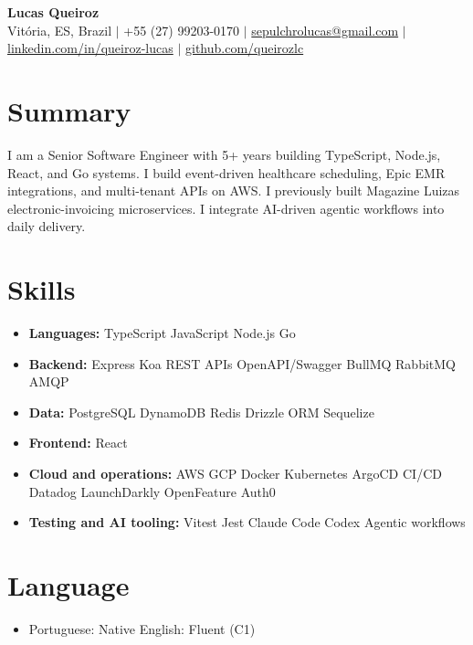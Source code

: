 \documentclass[letterpaper,10pt]{article}
\newcommand{\resumeItem}[1]{\item\small{#1}}
\newcommand{\resumeSubHeadingList}{\begin{itemize}[leftmargin=0.15in, label={}, nosep, beginpenalty=10000]}
\newcommand{\resumeSubHeadingListEnd}{\end{itemize}}
\begin{document}
\begin{center}
  \textbf{\Huge Lucas Queiroz} \\[3pt]
  \small Vit\'oria, ES, Brazil $|$ +55 (27) 99203-0170 $|$ \href{mailto:sepulchrolucas@gmail.com}{sepulchrolucas@gmail.com} $|$
  \href{https://linkedin.com/in/queiroz-lucas}{linkedin.com/in/queiroz-lucas} $|$
  \href{https://github.com/queirozlc}{github.com/queirozlc}
\end{center}
\vspace{2pt}

\section{Summary}
I am a Senior Software Engineer with 5+ years building TypeScript, Node.js, React, and Go systems. I build event-driven healthcare scheduling, Epic EMR integrations, and multi-tenant APIs on AWS. I previously built Magazine Luiza\textquotesingle{}s electronic-invoicing microservices. I integrate AI-driven agentic workflows into daily delivery.

\section{Skills}
\resumeSubHeadingList
\resumeItem{\textbf{Languages:} TypeScript \textbar{} JavaScript \textbar{} Node.js \textbar{} Go}
\resumeItem{\textbf{Backend:} Express \textbar{} Koa \textbar{} REST APIs \textbar{} OpenAPI/Swagger \textbar{} BullMQ \textbar{} RabbitMQ \textbar{} AMQP}
\resumeItem{\textbf{Data:} PostgreSQL \textbar{} DynamoDB \textbar{} Redis \textbar{} Drizzle ORM \textbar{} Sequelize}
\resumeItem{\textbf{Frontend:} React}
\resumeItem{\textbf{Cloud and operations:} AWS \textbar{} GCP \textbar{} Docker \textbar{} Kubernetes \textbar{} ArgoCD \textbar{} CI/CD \textbar{} Datadog \textbar{} LaunchDarkly \textbar{} OpenFeature \textbar{} Auth0}
\resumeItem{\textbf{Testing and AI tooling:} Vitest \textbar{} Jest \textbar{} Claude Code \textbar{} Codex \textbar{} Agentic workflows}\resumeSubHeadingListEnd

\section{Language}
\resumeSubHeadingList
\resumeItem{Portuguese: Native \textbar{} English: Fluent (C1)}
\resumeSubHeadingListEnd
\end{document}
